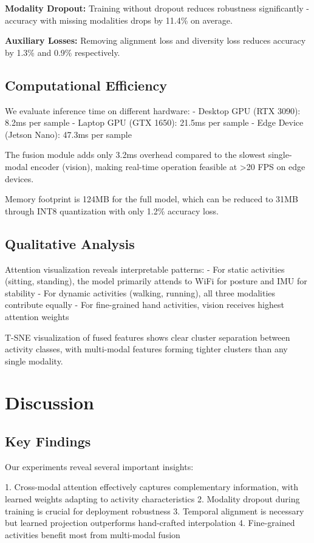 \documentclass[10pt,twocolumn]{article}
\begin{document}
\textbf{Modality Dropout:} Training without dropout reduces robustness significantly - accuracy with missing modalities drops by 11.4\% on average.

\textbf{Auxiliary Losses:} Removing alignment loss and diversity loss reduces accuracy by 1.3\% and 0.9\% respectively.

\subsection{Computational Efficiency}

We evaluate inference time on different hardware:
- Desktop GPU (RTX 3090): 8.2ms per sample
- Laptop GPU (GTX 1650): 21.5ms per sample  
- Edge Device (Jetson Nano): 47.3ms per sample

The fusion module adds only 3.2ms overhead compared to the slowest single-modal encoder (vision), making real-time operation feasible at >20 FPS on edge devices.

Memory footprint is 124MB for the full model, which can be reduced to 31MB through INT8 quantization with only 1.2\% accuracy loss.

\subsection{Qualitative Analysis}

Attention visualization reveals interpretable patterns:
- For static activities (sitting, standing), the model primarily attends to WiFi for posture and IMU for stability
- For dynamic activities (walking, running), all three modalities contribute equally
- For fine-grained hand activities, vision receives highest attention weights

T-SNE visualization of fused features shows clear cluster separation between activity classes, with multi-modal features forming tighter clusters than any single modality.

\section{Discussion}

\subsection{Key Findings}

Our experiments reveal several important insights:

1. Cross-modal attention effectively captures complementary information, with learned weights adapting to activity characteristics
2. Modality dropout during training is crucial for deployment robustness
3. Temporal alignment is necessary but learned projection outperforms hand-crafted interpolation
4. Fine-grained activities benefit most from multi-modal fusion
\end{document}
